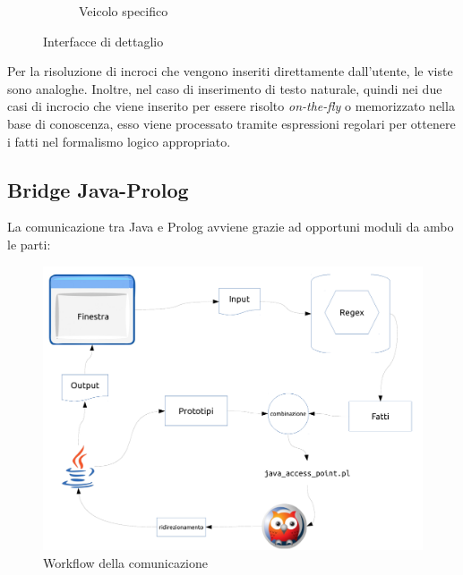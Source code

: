 \begin{figure}[!htb]
\begin{subfigure}[b]{.4\textwidth}
		\caption{Veicolo specifico}
	\end{subfigure}
	\caption{Interfacce di dettaglio}
\end{figure}
\restoregeometry


Per la risoluzione di incroci che vengono inseriti direttamente dall'utente, le viste sono analoghe. Inoltre,
nel caso di inserimento di testo naturale, quindi nei due casi di incrocio che viene inserito per essere risolto \textit{on-the-fly} o memorizzato nella base di conoscenza, esso viene processato tramite espressioni regolari per ottenere i fatti nel formalismo logico appropriato.



\subsection{Bridge Java-Prolog}

La comunicazione tra Java e Prolog avviene grazie ad opportuni moduli da ambo le parti:

\begin{figure}[!htb]
	\centering
	\includegraphics[width=\textwidth]{images/jap}
	\caption{Workflow della comunicazione}
\end{figure}

